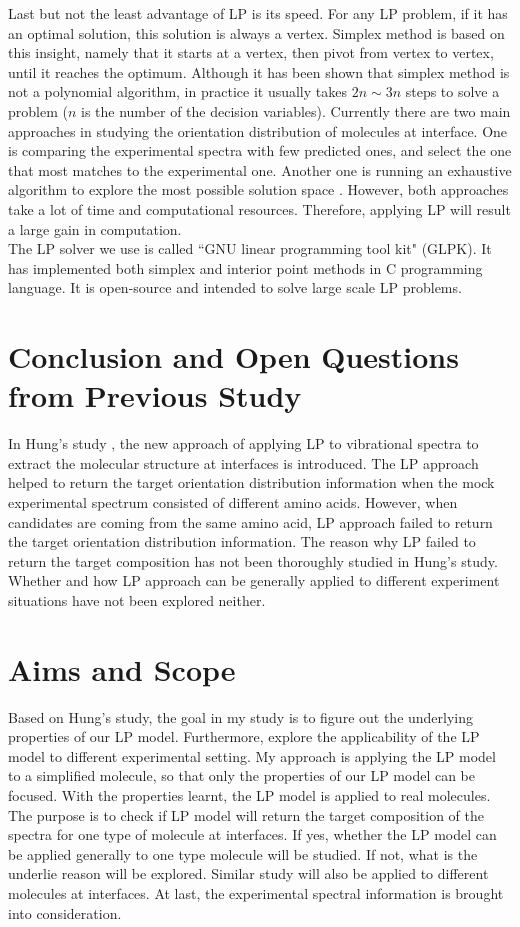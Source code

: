 Last but not the least advantage of LP is its speed. For any LP problem, if it has an optimal solution, this solution is always a vertex. Simplex method is based on this insight, namely that it starts at a vertex, then pivot from vertex to vertex, until it reaches the optimum. Although it has been shown that simplex method is not a polynomial algorithm, in practice it usually takes $2n\sim3n$ steps to solve a problem ($n$ is the number of the decision variables). Currently there are two main approaches in studying the orientation distribution of molecules at interface. One is comparing the experimental spectra with few predicted ones, and select the one that most matches to the experimental one. Another one is running an exhaustive algorithm to explore the most possible solution space \cite{hore0033-rotations}. However, both approaches take a lot of time and computational resources. Therefore, applying LP will result a large gain in computation.\\

The LP solver we use is called ``GNU linear programming tool kit" (GLPK). It has implemented both simplex and interior point methods in C programming language. It is open-source and intended to solve large scale LP problems. \\

\section{Conclusion and Open Questions from Previous Study}
In Hung's study \cite{KuoKaiHung:Thesis:2015}, the new approach of applying LP to vibrational spectra to extract the molecular structure at interfaces is introduced. The LP approach helped to return the target orientation distribution information when the mock experimental spectrum consisted of different amino acids. However, when candidates are coming from the same amino acid, LP approach failed to return the target orientation distribution information. The reason why LP failed to return the target composition has not been thoroughly studied in Hung's study. Whether and how LP approach can be generally applied to different experiment situations have not been explored neither.
	
\section{Aims and Scope}
Based on Hung's study, the goal in my study is to figure out the underlying properties of our LP model. Furthermore, explore the applicability of the LP model to different experimental setting. My approach is applying the LP model to a simplified molecule, so that only the properties of our LP model can be focused. With the properties learnt, the LP model is applied to real molecules. The purpose is to check if LP model will return the target composition of the spectra for one type of molecule at interfaces. If yes, whether the LP model can be applied generally to one type molecule will be studied. If not, what is the underlie reason will be explored. Similar study will also be applied to different molecules at interfaces. At last, the experimental spectral information is brought into consideration. \\

